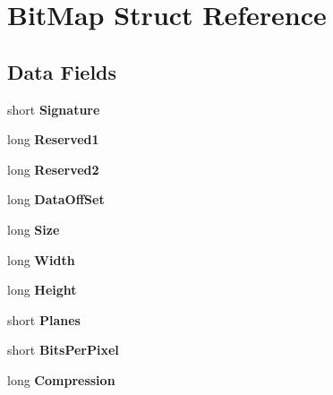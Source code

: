 \hypertarget{struct_bit_map}{}\section{Bit\+Map Struct Reference}
\label{struct_bit_map}
\subsection*{Data Fields}
\begin{DoxyCompactItemize}
\item 
\mbox{\label{struct_bit_map_aab46bd145ea2a88752158112a79ceb48}} 
short {\bfseries Signature}
\item 
\mbox{\label{struct_bit_map_a56c4a614cdceb5d1e327bf0c23e520bf}} 
long {\bfseries Reserved1}
\item 
\mbox{\label{struct_bit_map_a03e54d74b8ccdbaea6916305120f6438}} 
long {\bfseries Reserved2}
\item 
\mbox{\label{struct_bit_map_a4b6d2aa420075c7893d22b01846e8307}} 
long {\bfseries Data\+Off\+Set}
\item 
\mbox{\label{struct_bit_map_ae600e44a60983cdf469fe00aa2a490c7}} 
long {\bfseries Size}
\item 
\mbox{\label{struct_bit_map_a20c0d8eeeb1a2c61f0986a1c627c769a}} 
long {\bfseries Width}
\item 
\mbox{\label{struct_bit_map_ae419f6e85ca63aca1b00db3e46953e83}} 
long {\bfseries Height}
\item 
\mbox{\label{struct_bit_map_a4ae22e469f36cdfa4781128c2fce55bd}} 
short {\bfseries Planes}
\item 
\mbox{\label{struct_bit_map_aabe64990f5eb7d6acc023671d0d87f06}} 
short {\bfseries Bits\+Per\+Pixel}
\item 
\mbox{\label{struct_bit_map_a5450354817e734861ff03326e3358957}} 
long {\bfseries Compression}
\item 
\mbox{\label{struct_bit_map_abc024d2f2d4b56848df9653cd78d9ab3}} 

\end{DoxyCompactItemize}

